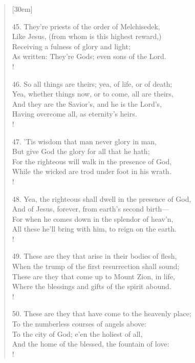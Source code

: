 \begin{verse}[30em]
\begin{altverse}
				45. They're priests of the order of Melchisedek, \\ 
				Like Jesus, (from whom is this highest reward,) \\ 
				Receiving a fulness of glory and light; \\ 
				As written: They're Gods; even sons of the Lord. \\!
				 
				46. So all things are theirs; yea, of life, or of death; \\ 
				Yea, whether things now, or to come, all are theirs, \\ 
				And they are the Savior's, and he is the Lord's, \\ 
				Having overcome all, as eternity's heirs. \\!
				 
				47. 'Tis wisdom that man never glory in man, \\ 
				But give God the glory for all that he hath; \\ 
				For the righteous will walk in the presence of God, \\ 
				While the wicked are trod under foot in his wrath. \\!
				 
				48. Yea, the righteous shall dwell in the presence of God, \\ 
				And of Jesus, forever, from earth's second birth--- \\ 
				For when he comes down in the splendor of heav'n, \\ 
				All these he'll bring with him, to reign on the earth. \\!
				 
				49. These are they that arise in their bodies of flesh, \\ 
				When the trump of the first resurrection shall sound; \\ 
				These are they that come up to Mount Zion, in life, \\ 
				Where the blessings and gifts of the spirit abound. \\!
				 
				50. These are they that have come to the heavenly place; \\ 
				To the numberless courses of angels above: \\ 
				To the city of God; e'en the holiest of all, \\ 
				And the home of the blessed, the fountain of love: \\!
				 

\end{altverse}
\end{verse}
